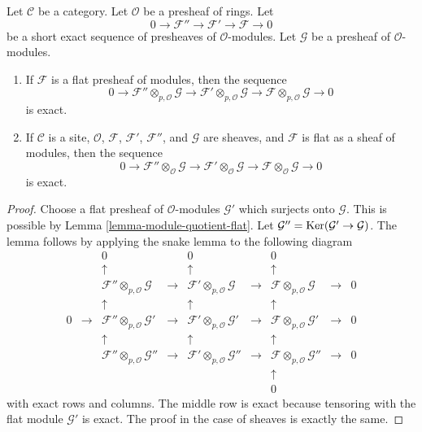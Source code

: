 \begin{lemma}
\label{lemma-flat-tor-zero}
Let $\mathcal{C}$ be a category.
Let $\mathcal{O}$ be a presheaf of rings.
Let
$$
0 \to \mathcal{F}'' \to \mathcal{F}' \to \mathcal{F} \to 0
$$
be a short exact sequence of presheaves of $\mathcal{O}$-modules.
Let $\mathcal{G}$ be a presheaf of $\mathcal{O}$-modules.
\begin{enumerate}
\item If $\mathcal{F}$ is a flat presheaf of modules, then
the sequence
$$
0 \to
\mathcal{F}'' \otimes_{p, \mathcal{O}} \mathcal{G} \to
\mathcal{F}' \otimes_{p, \mathcal{O}} \mathcal{G} \to
\mathcal{F} \otimes_{p, \mathcal{O}} \mathcal{G} \to 0
$$
is exact.
\item If $\mathcal{C}$ is a site, $\mathcal{O}$,
$\mathcal{F}$, $\mathcal{F}'$, $\mathcal{F}''$, and
$\mathcal{G}$ are sheaves, and $\mathcal{F}$ is flat
as a sheaf of modules, then the sequence
$$
0 \to
\mathcal{F}'' \otimes_\mathcal{O} \mathcal{G} \to
\mathcal{F}' \otimes_\mathcal{O} \mathcal{G} \to
\mathcal{F} \otimes_\mathcal{O} \mathcal{G} \to 0
$$
is exact.
\end{enumerate}
\end{lemma}

\begin{proof}
Choose a flat presheaf of $\mathcal{O}$-modules $\mathcal{G}'$
which surjects onto $\mathcal{G}$. This is possible by
Lemma \ref{lemma-module-quotient-flat}. Let
$\mathcal{G}'' = \mathop{\mathrm{Ker}}(\mathcal{G}' \to \mathcal{G})$.
The lemma follows by applying the snake lemma to the following
diagram
$$
\begin{matrix}
 & & 0 & & 0 & & 0 & & \\
 & & \uparrow & & \uparrow & & \uparrow & & \\
 & & \mathcal{F}'' \otimes_{p, \mathcal{O}} \mathcal{G} & \to &
     \mathcal{F}' \otimes_{p, \mathcal{O}} \mathcal{G} & \to &
     \mathcal{F} \otimes_{p, \mathcal{O}} \mathcal{G} & \to & 0 \\
 & & \uparrow & & \uparrow & & \uparrow & & \\
0 & \to & \mathcal{F}'' \otimes_{p, \mathcal{O}} \mathcal{G}' & \to &
          \mathcal{F}' \otimes_{p, \mathcal{O}} \mathcal{G}' & \to &
          \mathcal{F} \otimes_{p, \mathcal{O}} \mathcal{G}' & \to & 0 \\
 & & \uparrow & & \uparrow & & \uparrow & & \\
 & & \mathcal{F}'' \otimes_{p, \mathcal{O}} \mathcal{G}'' & \to &
     \mathcal{F}' \otimes_{p, \mathcal{O}} \mathcal{G}'' & \to &
     \mathcal{F} \otimes_{p, \mathcal{O}} \mathcal{G}'' & \to & 0 \\
 & & & & & & \uparrow & & \\
 & & & & & & 0 & &
\end{matrix}
$$
with exact rows and columns. The middle row is exact because tensoring
with the flat module $\mathcal{G}'$ is exact. The proof in the case
of sheaves is exactly the same.
\end{proof}

